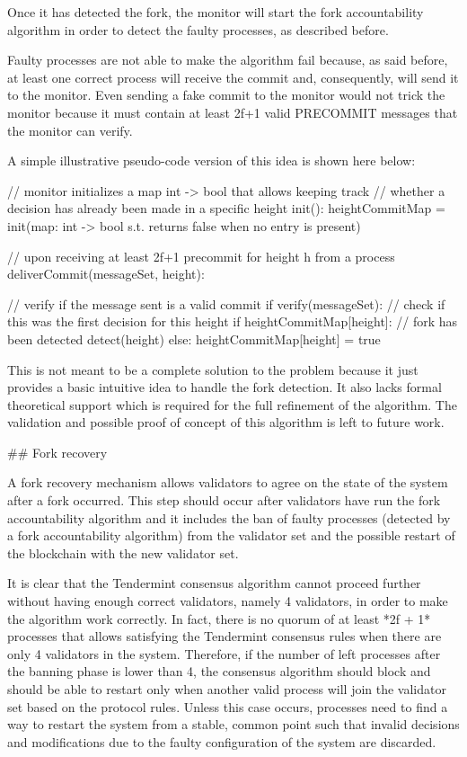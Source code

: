 \documentclass[a4paper,11pt,oneside]{report}
\begin{document}
\begin{markdown}
Once it has detected the fork, the monitor will start the fork accountability algorithm in order to detect the faulty processes, as described before.

Faulty processes are not able to make the algorithm fail because, as said before, at least one correct process will receive the commit and, consequently, will send it to the monitor. Even sending a fake commit to the monitor would not trick the monitor because it must contain at least 2f+1 valid PRECOMMIT messages that the monitor can verify.

A simple illustrative pseudo-code version of this idea is shown here below:


    // monitor initializes a map int -> bool that allows keeping track
    // whether a decision has already been made in a specific height
    init():
	    heightCommitMap = init(map: int -> bool s.t. returns false when no entry is present)

    // upon receiving at least 2f+1 precommit for height h from a process 
    deliverCommit(messageSet, height):
   
        // verify if the message sent is a valid commit
	    if verify(messageSet):
		    // check if this was the first decision for this height
		    if heightCommitMap[height]:
			    // fork has been detected
			    detect(height)
		    else:
			    heightCommitMap[height] = true

This is not meant to be a complete solution to the problem because it just provides a basic intuitive idea to handle the fork detection. It also lacks formal theoretical support which is required for the full refinement of the algorithm.
The validation and possible proof of concept of this algorithm is left to future work.

## Fork recovery

A fork recovery mechanism allows validators to agree on the state of the system after a fork occurred. 
This step should occur after validators have run the fork accountability algorithm and it includes the ban of faulty processes (detected by a fork accountability algorithm) from the validator set and the possible restart of the blockchain with the new validator set.

It is clear that the Tendermint consensus algorithm cannot proceed further without having enough correct validators, namely 4 validators, in order to make the algorithm work correctly. In fact, there is no quorum of at least *2f + 1* processes that allows satisfying the Tendermint consensus rules when there are only 4 validators in the system. 
Therefore, if the number of left processes after the banning phase is lower than 4, the consensus algorithm should block and should be able to restart only when another valid process will join the validator set based on the protocol rules.
Unless this case occurs, processes need to find a way to restart the system from a stable, common point such that invalid decisions and modifications due to the faulty configuration of the system are discarded.


\end{markdown}
\end{document}
